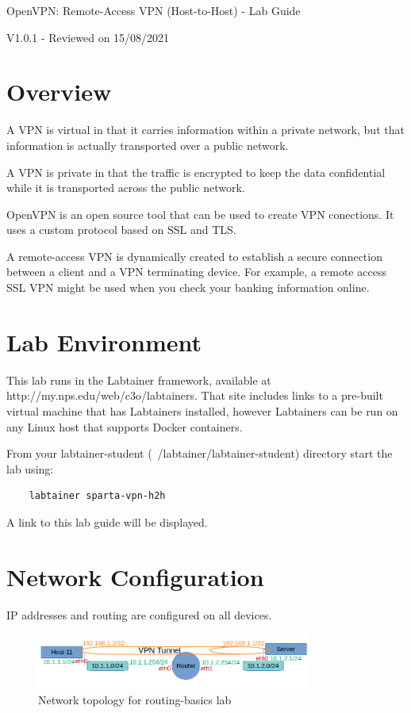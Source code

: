 


\begin{center}
{\LARGE OpenVPN: Remote-Access VPN (Host-to-Host) - Lab Guide}

V1.0.1 - Reviewed on 15/08/2021
\vspace{0.1in}\\
\end{center}

\copyrightnotice

\section{Overview}
A VPN is virtual in that it carries information within a private network, but that information is actually transported over a public network.

A VPN is private in that the traffic is encrypted to keep the data confidential while it is transported across the public network.

OpenVPN is an open source tool that can be used to create VPN conections. It uses a custom protocol based on SSL and TLS.

A remote-access VPN is dynamically created to establish a secure connection between a client and a VPN terminating device. For example, a remote access SSL VPN might be used when you check your banking information online.

\section{Lab Environment}
This lab runs in the Labtainer framework,
available at http://my.nps.edu/web/c3o/labtainers.
That site includes links to a pre-built virtual machine
that has Labtainers installed, however Labtainers can
be run on any Linux host that supports Docker containers.

From your labtainer-student (~/labtainer/labtainer-student) directory start the lab using:
\begin{verbatim}
    labtainer sparta-vpn-h2h
\end{verbatim}
\noindent A link to this lab guide will be displayed.

\section{Network Configuration}
IP addresses and routing are configured on all devices.

\begin{figure}[H]
\begin{center}
\includegraphics [width=0.8\textwidth]{labtainers-vpn1-lab-01.png}
\end{center}
\caption{Network topology for routing-basics lab}
\label{fig:topology}
\end{figure}

